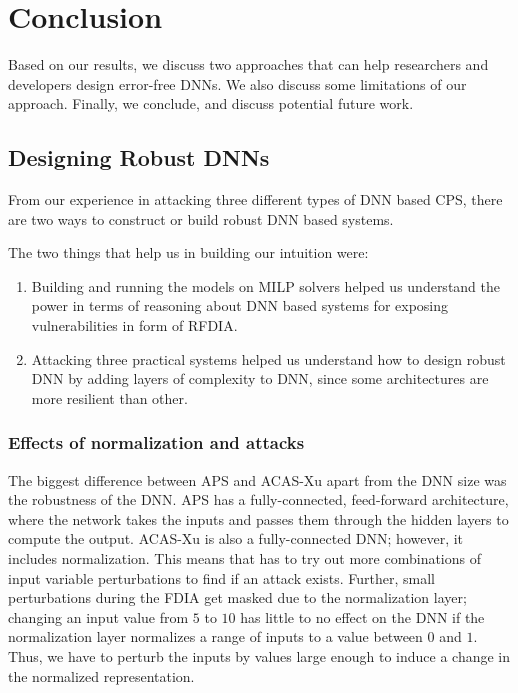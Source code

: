 \chapter{Conclusion}
\label{conclusion}


Based on our results, we discuss two approaches that can help researchers and developers design error-free \ac{DNN}s. 
We also discuss some limitations of our approach.
Finally, we conclude, and discuss potential future work.


\section{Designing Robust DNNs}
From our experience in attacking three different types of \ac{DNN} based CPS, there are two ways to construct or build robust \ac{DNN} based systems.

The two things that help us in building our intuition were:
\begin{enumerate}
	\item Building and running the models on \ac{MILP} solvers helped us understand the power in terms of reasoning about \ac{DNN} based systems for exposing vulnerabilities in form of \ac{RFDIA}. 
	\item Attacking three practical systems helped us understand how to design robust \ac{DNN} by adding layers of complexity to \ac{DNN}, since some architectures are more resilient than other. 
\end{enumerate}


\subsection{Effects of normalization and attacks}

The biggest difference between \ac{APS} and \ac{ACAS-Xu} apart from the \ac{DNN} size was the robustness of the \ac{DNN}. 
\ac{APS} has a fully-connected, feed-forward architecture, where the network takes the inputs and passes them through the hidden layers to compute the output. 
\ac{ACAS-Xu} is also a fully-connected \ac{DNN}; however, it includes normalization.
This means that \tool has to try out more combinations of input variable perturbations to find if an attack exists. 
Further, small perturbations during the \ac{FDIA} get masked due to the normalization layer; changing an input value from $5$ to $10$ has little to no effect on the \ac{DNN} if the normalization layer normalizes a range of inputs to a value between $0$ and $1$. 
Thus, we have to perturb the inputs by values large enough to induce a change in the normalized representation.
 
